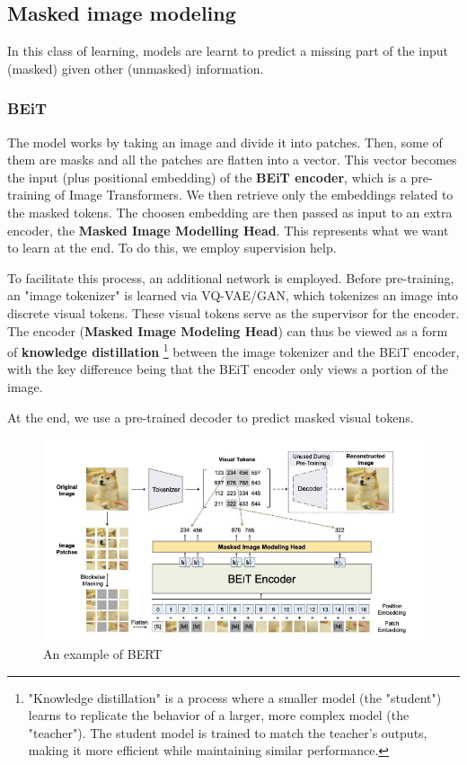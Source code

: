 \subsection{Masked image modeling}

In this class of learning, models are learnt to predict a missing part of the input (masked) given other (unmasked) information.

\subsubsection{BEiT}

The model works by taking an image and divide it into patches. Then, some of them are masks and all the patches are flatten into a vector. This vector becomes the input (plus positional embedding) of the \textbf{BEiT encoder}, which is a pre-training of Image Transformers. We then retrieve only the embeddings related to the masked tokens. The choosen embedding are then passed as input to an extra encoder, the \textbf{Masked Image Modelling Head}. This represents what we want to learn at the end. To do this, we employ supervision help.

To facilitate this process, an additional network is employed. Before pre-training, an "image tokenizer" is learned via VQ-VAE/GAN, which tokenizes an image into discrete visual tokens. These visual tokens serve as the supervisor for the encoder. The encoder (\textbf{Masked Image Modeling Head}) can thus be viewed as a form of \textbf{knowledge distillation} \footnote{"Knowledge distillation" is a process where a smaller model (the "student") learns to replicate the behavior of a larger, more complex model (the "teacher"). The student model is trained to match the teacher's outputs, making it more efficient while maintaining similar performance.} between the image tokenizer and the BEiT encoder, with the key difference being that the BEiT encoder only views a portion of the image.

At the end, we use a pre-trained decoder to predict masked visual tokens.

\begin{figure}[H]
    \centering
    \includegraphics[width=1\linewidth]{tikz/BERT.png}
    \caption{An example of BERT}
    \label{fig:BERT}
\end{figure}

